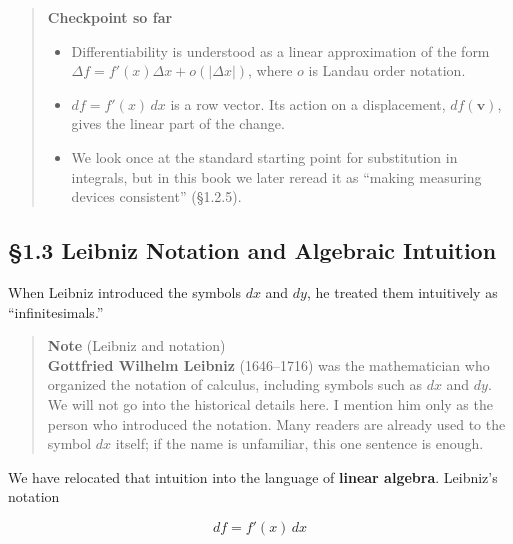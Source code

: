 \documentclass[a4paper,12pt,openany]{book}
\begin{document}
\par\vspace{0.35em}\par

\begin{quote}
\textbf{Checkpoint so far}

\begin{itemize}
\item
  Differentiability is understood as a linear approximation of the form
  \(\Delta f=f'(x)\Delta x+o(|\Delta x|)\), where \(o\) is Landau order
  notation.
\item
  \(df=f'(x)\,dx\) is a row vector. Its action on a displacement,
  \(df(\mathbf{v})\), gives the linear part of the change.
\item
  We look once at the standard starting point for substitution in
  integrals, but in this book we later reread it as ``making measuring
  devices consistent'' (§1.2.5).
\end{itemize}
\end{quote}

\par\vspace{0.35em}\par

\hypertarget{leibniz-notation-and-algebraic-intuition}{%
\subsection{§1.3 Leibniz Notation and Algebraic
Intuition}\label{leibniz-notation-and-algebraic-intuition}}

When Leibniz introduced the symbols \(dx\) and \(dy\), he treated them
intuitively as ``infinitesimals.''

\begin{quote}
\textbf{Note} (Leibniz and notation)\\
\textbf{Gottfried Wilhelm Leibniz} (1646–1716) was the mathematician
who organized the notation of calculus, including symbols such as \(dx\)
and \(dy\). We will not go into the historical details here. I mention
him only as the person who introduced the notation. Many readers are
already used to the symbol \(dx\) itself; if the name is unfamiliar,
this one sentence is enough.
\end{quote}

We have relocated that intuition into the language of
\textbf{linear algebra}. Leibniz's notation

\[
df=f'(x)\,dx
\]
\end{document}
